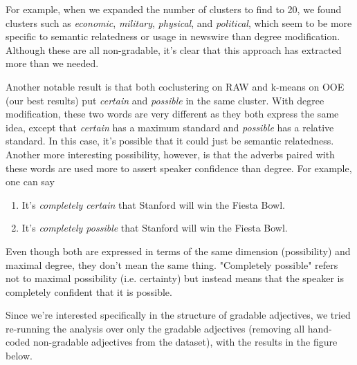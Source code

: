 \documentclass[11pt]{amsart}
\begin{document}
For example, when we expanded the number of clusters to find to 20, we found clusters such as \textit{economic}, \textit{military}, \textit{physical}, and \textit{political}, which seem to be more specific to semantic relatedness or usage in newswire than degree modification. Although these are all non-gradable, it's clear that this approach has extracted more than we needed.

Another notable result is that both coclustering on RAW and k-means on OOE (our best results) put \textit{certain} and \textit{possible} in the same cluster. With degree modification, these two words are very different as they both express the same idea, except that \textit{certain} has a maximum standard and \textit{possible} has a relative standard. In this case, it's possible that it could just be semantic relatedness. Another more interesting possibility, however, is that the adverbs paired with these words are used more to assert speaker confidence than degree. For example, one can say

\begin{enumerate}
\item It's \textit{completely certain} that Stanford will win the Fiesta Bowl.
\item It's \textit{completely possible} that Stanford will win the Fiesta Bowl.
\end{enumerate}

Even though both are expressed in terms of the same dimension (possibility) and maximal degree, they don't mean the same thing. "Completely possible" refers not to maximal possibility (i.e. certainty) but instead means that the speaker is completely confident that it is possible.

Since we're interested specifically in the structure of gradable adjectives, we tried re-running the analysis over only the gradable adjectives (removing all hand-coded non-gradable adjectives from the dataset), with the results in the figure below.
\end{document}
